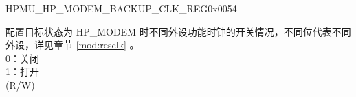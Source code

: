 \begin{register}{H}{PMU\_HP\_MODEM\_BACKUP\_CLK\_REG}{0x0054}\label{regdesc:PMUHPMODEMBACKUPCLKREG}
%
\regnewline%
\begin{regdesc}\begin{reglist}
\label{fielddesc:PMUHPMODEMBACKUPICGFUNCEN}\item [PMU\_HP\_MODEM\_BACKUP\_ICG\_FUNC\_EN] 配置目标状态为 HP\_MODEM 时不同外设功能时钟的开关情况，不同位代表不同外设，详见章节 \ref{mod:resclk} \textit{}。\\
0：关闭\\
1：打开\\
(R/W)
\end{reglist}\end{regdesc}
\end{register}


